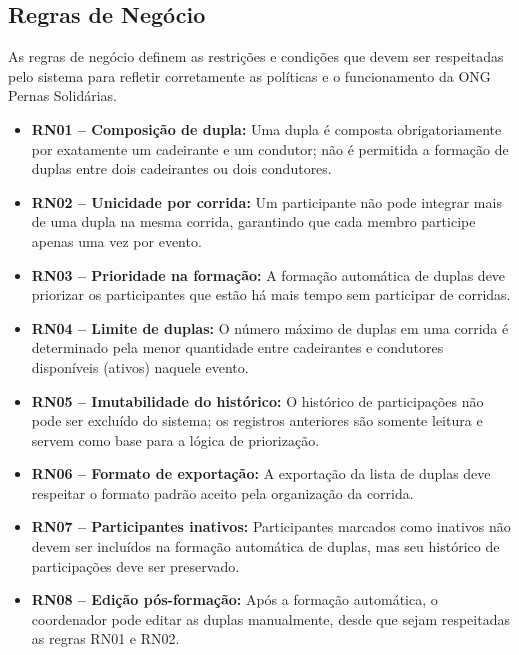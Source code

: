 \documentclass[12pt,a4paper]{article}
\begin{document}
\subsection{Regras de Negócio}

As regras de negócio definem as restrições e condições que devem ser respeitadas pelo
sistema para refletir corretamente as políticas e o funcionamento da ONG Pernas
Solidárias.

\begin{itemize}

    \item \textbf{RN01 – Composição de dupla:} Uma dupla é composta obrigatoriamente
    por exatamente um cadeirante e um condutor; não é permitida a formação de duplas
    entre dois cadeirantes ou dois condutores.

    \item \textbf{RN02 – Unicidade por corrida:} Um participante não pode integrar mais
    de uma dupla na mesma corrida, garantindo que cada membro participe apenas uma vez
    por evento.

    \item \textbf{RN03 – Prioridade na formação:} A formação automática de duplas deve
    priorizar os participantes que estão há mais tempo sem participar de corridas.

    \item \textbf{RN04 – Limite de duplas:} O número máximo de duplas em uma corrida é
    determinado pela menor quantidade entre cadeirantes e condutores disponíveis (ativos)
    naquele evento.

    \item \textbf{RN05 – Imutabilidade do histórico:} O histórico de participações não
    pode ser excluído do sistema; os registros anteriores são somente leitura e servem
    como base para a lógica de priorização.

    \item \textbf{RN06 – Formato de exportação:} A exportação da lista de duplas deve
    respeitar o formato padrão aceito pela organização da corrida.

    \item \textbf{RN07 – Participantes inativos:} Participantes marcados como inativos
    não devem ser incluídos na formação automática de duplas, mas seu histórico de
    participações deve ser preservado.

    \item \textbf{RN08 – Edição pós-formação:} Após a formação automática, o
    coordenador pode editar as duplas manualmente, desde que sejam respeitadas as regras
    RN01 e RN02.


\end{itemize}
\end{document}
